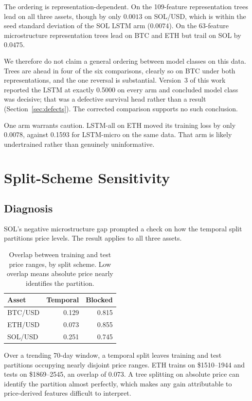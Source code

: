 \documentclass[11pt]{article}
\begin{document}
\noindent
The ordering is representation-dependent. On the 109-feature representation
trees lead on all three assets, though by only $0.0013$ on SOL/USD, which is
within the seed standard deviation of the SOL LSTM arm ($0.0074$). On the
63-feature microstructure representation trees lead on BTC and ETH but trail on
SOL by $0.0475$.

We therefore do not claim a general ordering between model classes on this
data. Trees are ahead in four of the six comparisons, clearly so on BTC under
both representations, and the one reversal is substantial. Version~3 of this
work reported the LSTM at exactly 0.5000 on every arm and concluded model class
was decisive; that was a defective survival head rather than a result
(Section~\ref{sec:defects}). The corrected comparison supports no such
conclusion.

One arm warrants caution. LSTM-all on ETH moved its training loss by only
0.0078, against 0.1593 for LSTM-micro on the same data. That arm is likely
undertrained rather than genuinely uninformative.

\section{Split-Scheme Sensitivity}
\label{sec:regime}

\subsection{Diagnosis}

SOL's negative microstructure gap prompted a check on how the temporal split
partitions price levels. The result applies to all three assets.

\begin{table}[ht]
\centering
\caption{Overlap between training and test price ranges, by split scheme. Low
overlap means absolute price nearly identifies the partition.}
\label{tab:overlap}
\begin{tabular}{lrr}
\toprule
Asset & Temporal & Blocked \\
\midrule
BTC/USD & 0.129 & 0.815 \\
ETH/USD & 0.073 & 0.855 \\
SOL/USD & 0.251 & 0.745 \\
\bottomrule
\end{tabular}
\end{table}

\noindent
Over a trending 70-day window, a temporal split leaves training and test
partitions occupying nearly disjoint price ranges. ETH trains on \$1510--1944
and tests on \$1869--2545, an overlap of 0.073. A tree splitting on absolute
price can identify the partition almost perfectly, which makes any gain
attributable to price-derived features difficult to interpret.
\end{document}
